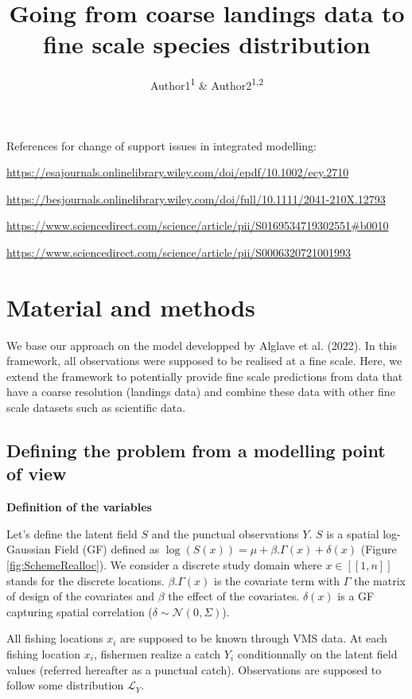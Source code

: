 \documentclass[
  english,
  man,floatsintext]{apa6}
\title{Going from coarse landings data to fine scale species distribution}
\author{Author1\textsuperscript{1} \& Author2\textsuperscript{1,2}}
\date{}
\affiliation{\vspace{0.5cm}\textsuperscript{1} Instit1\\\textsuperscript{2} Instit2}
\begin{document}
\maketitle

References for change of support issues in integrated modelling:

\url{https://esajournals.onlinelibrary.wiley.com/doi/epdf/10.1002/ecy.2710}

\url{https://besjournals.onlinelibrary.wiley.com/doi/full/10.1111/2041-210X.12793}

\url{https://www.sciencedirect.com/science/article/pii/S0169534719302551\#b0010}

\url{https://www.sciencedirect.com/science/article/pii/S0006320721001993}

\hypertarget{material-and-methods}{%
\section{Material and methods}\label{material-and-methods}}

We base our approach on the model developped by Alglave et al. (2022). In this framework, all observations were supposed to be realised at a fine scale. Here, we extend the framework to potentially provide fine scale predictions from data that have a coarse resolution (landings data) and combine these data with other fine scale datasets such as scientific data.

\hypertarget{defining-the-problem-from-a-modelling-point-of-view}{%
\subsection{Defining the problem from a modelling point of view}\label{defining-the-problem-from-a-modelling-point-of-view}}

\textbf{Definition of the variables}

Let's define the latent field \(S\) and the punctual observations \(Y\). \(S\) is a spatial log-Gaussian Field (GF) defined as \(\log(S(x))=\mu+\beta . \Gamma(x) + \delta(x)\) (Figure \ref{fig:SchemeRealloc}). We consider a discrete study domain where \(x \in [\![1,n]\!]\) stands for the discrete locations. \(\beta . \Gamma(x)\) is the covariate term with \(\Gamma\) the matrix of design of the covariates and \(\beta\) the effect of the covariates. \(\delta(x)\) is a GF capturing spatial correlation (\(\delta \sim \mathcal{N}(0,\Sigma)\)).

All fishing locations \(x_i\) are supposed to be known through VMS data. At each fishing location \(x_i\), fishermen realize a catch \(Y_i\) conditionnally on the latent field values (referred hereafter as a punctual catch). Observations are supposed to follow some distribution \(\mathcal{L}_Y\).
\end{document}

